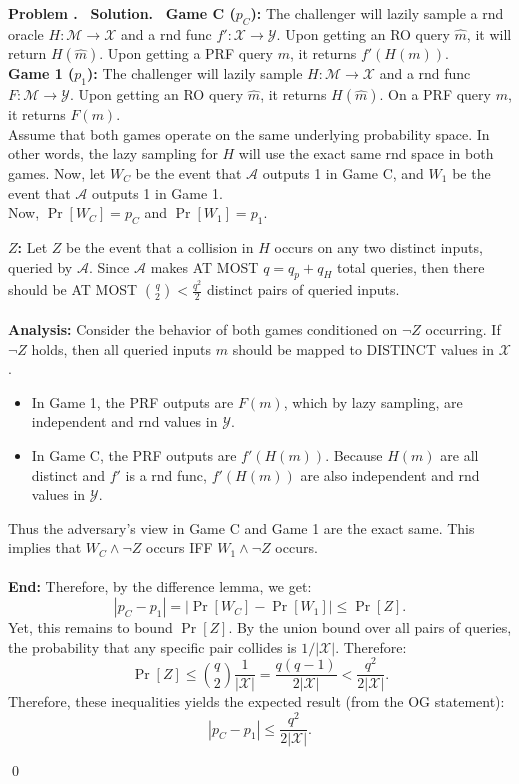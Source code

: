 \documentclass[12pt]{article}
\theoremstyle{definition}
\newcommand{\addbigskip}{\addvspace{\bigskipamount}}
\newcounter{problemnum}
\newenvironment{problem}
     {\addbigskip \setcounter{partnum}{0}
      \noindent\stepcounter{problemnum}\textbf{Problem
                                             \arabic{problemnum}.\ }}
     {\par\addbigskip}
\newenvironment{solution}
     {\addbigskip
      \noindent\color{blue}\textbf{Solution.\ }}
     {\par\addbigskip}
\newenvironment{solution}
     {\comment}
     {\endcomment}
\newcounter{partnum}
\newcommand{\A}{\mathcal{A}}
\newcommand{\X}{\mathcal{X}}
\newcommand{\Y}{\mathcal{Y}}
\newcommand{\M}{\mathcal{M}}
\begin{document}
\begin{problem}
\begin{solution}
\noindent\textbf{Game C ($p_C$):} The challenger will lazily sample a rnd oracle $H: \M \to \X$ and a rnd func $f': \X \to \Y$.
Upon getting an RO query $\hat{m}$, it will return $H(\hat{m})$.
Upon getting a PRF query $m$, it returns $f'(H(m))$.\\

\noindent\textbf{Game 1 ($p_1$):} The challenger will lazily sample $H: \M \to \X$ and a rnd func $F: \M \to \Y$.
Upon getting an RO query $\hat{m}$, it returns $H(\hat{m})$.
On a PRF query $m$, it returns $F(m)$.\\

\noindent Assume that both games operate on the same underlying probability space.
In other words, the lazy sampling for $H$ will use the exact same rnd space in both games.
Now, let $W_C$ be the event that $\A$ outputs 1 in Game C, and $W_1$ be the event that $\A$ outputs 1 in Game 1.\\

\noindent Now, $\Pr[W_C] = p_C$ and $\Pr[W_1] = p_1$. \newpage

\noindent\textbf{$Z$:} Let $Z$ be the event that a collision in $H$ occurs on any two distinct inputs, queried by $\A$.
Since $\A$ makes AT MOST $q = q_p + q_H$ total queries, then there should be AT MOST $\binom{q}{2} < \frac{q^2}{2}$ distinct pairs of queried inputs.\\\\

\noindent\textbf{Analysis:} Consider the behavior of both games conditioned on $\neg Z$ occurring.
If $\neg Z$ holds, then all queried inputs $m$ should be mapped to DISTINCT values in $\X$. 
\begin{itemize}
    \item In Game 1, the PRF outputs are $F(m)$, which by lazy sampling, are independent and rnd values in $\Y$.
    \item In Game C, the PRF outputs are $f'(H(m))$.
    Because $H(m)$ are all distinct and $f'$ is a rnd func, $f'(H(m))$ are also independent and rnd values in $\Y$.
\end{itemize}
\noindent
Thus the adversary's view in Game C and Game 1 are the exact same. This implies that $W_C \land \neg Z$ occurs IFF $W_1 \land \neg Z$ occurs.\\\\

\noindent\textbf{End:}
Therefore, by the difference lemma, we get:
\[
|p_C - p_1| = |\Pr[W_C] - \Pr[W_1]| \le \Pr[Z].
\]
Yet, this remains to bound $\Pr[Z]$. By the union bound over all pairs of queries, the probability that any specific pair collides is $1/|\X|$. Therefore:
\[
\Pr[Z] \le \binom{q}{2} \frac{1}{|\X|} = \frac{q(q-1)}{2|\X|} < \frac{q^2}{2|\X|}.
\]
Therefore, these inequalities yields the expected result (from the OG statement):
\[
|p_C - p_1| \le \frac{q^2}{2|\X|}.
\]

\qed
\end{solution}	
\end{problem}
\end{document}
